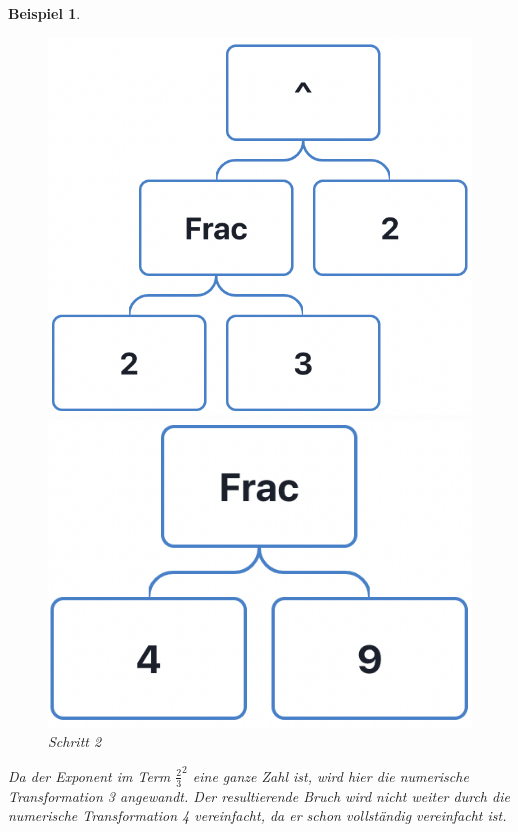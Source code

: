 \documentclass[11pt]{article}
\newtheorem{example}{Beispiel}
\begin{document}
\begin{example}
  \begin{figure}[h]
    \begin{minipage}{.5\textwidth}
      \centering
      \includegraphics[scale=0.4]{trees/power/beispiel_1_1.png}
      \caption{Schritt 1}
    \end{minipage}
    \begin{minipage}{.5\textwidth}
      \centering
      \includegraphics[scale=0.4]{trees/power/beispiel_1_2.png}
      \caption{Schritt 2}
    \end{minipage}
  \end{figure}
  Da der Exponent im Term $\frac{2}{3}^2$ eine ganze Zahl ist, wird hier die numerische Transformation 3 angewandt. 
  Der resultierende Bruch wird nicht weiter durch die numerische Transformation 4 vereinfacht,
  da er schon vollständig vereinfacht ist.
\end{example}
\end{document}
